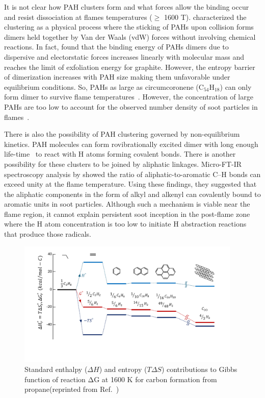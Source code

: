 It is not clear how PAH clusters form and what forces allow the binding occur and resist dissociation at flames temperatures ($\ge$ 1600 T). \citet{frenklach2002reaction} characterized the clustering as a physical process where the sticking of PAHs upon collision forms dimers held together by Van der Waals (vdW) forces without involving chemical reactions. In fact, \citet{herdman2008intermolecular} found that the binding energy of PAHs dimers due to dispersive and electorstatic forces increases linearly with molecular mass and reaches the limit of exfoliation energy for graphite. However, the entropy barrier of dimerization increases with PAH size making them unfavorable under equilibrium conditions. So, PAHs as large as circumcoronene ($\mathrm{C_{54}H_{18}}$) can only form dimer to survive flame temperatures~\citep{Wang2011}. However, the concentration of large PAHs are too low to account for the observed number density of soot particles in flames~\citep{totton2012quantitative}. 

There is also the possibility of PAH clustering governed by non-equilibrium kinetics. PAH molecules can form rovibrationally excited dimer with long enough life-time~\cite{wong2009molecular} to react with H atoms forming covalent bonds. There is another possibility for these clusters to be joined by aliphatic linkages. Micro-FT-IR spectroscopy analysis by \citet{cain2011evidence} showed the ratio of aliphatic-to-aromatic C–H bonds can exceed unity at the flame temperature. Using these findings, they suggested that
the aliphatic components in the form of alkyl and
alkenyl can covalently bound to aromatic units in soot particles. Although such a mechanism is viable near the flame region, it cannot explain persistent soot inception in the post-flame zone~\citep{zhao2005particle} where the H atom concentration is too low to initiate H abstraction reactions that produce those radicals.

\begin{figure}[!htbp]
	\centering
	\includegraphics[height=60mm, ]{Figures/Introduction/gibbs_propane.pdf}
	\caption{Standard enthalpy (${\Delta H}$) and entropy (${T\Delta S}$) contributions to Gibbs function of reaction $\mathrm{\Delta G}$ at 1600 K for carbon formation from propane(reprinted from Ref.~\citep{Wang2011})}
\end{figure} 

